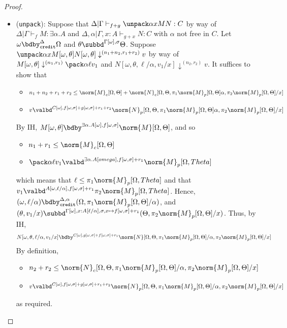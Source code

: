\begin{proof}
\begin{itemize}
  \item (\texttt{unpack}): Suppose that $\Delta | \Gamma \vdash_{f+g} \unpack \alpha x M N : C$ by way of $\Delta | \Gamma \vdash_f M : \exists \alpha.A$ and $\Delta,\alpha | \Gamma,x:A \vdash_{g+x} N : C$ with $\alpha$ not free in $C$. Let $\omega \bdby_\texttt{credit}^\Delta \Omega$ and $\theta \subbd^{\Gamma[\omega],\sigma} \Theta$. Suppose $ \unpack \alpha x {M[\omega,\theta]} {N[\omega,\theta]} \downarrow^{(n_1+n_2,r_1+r_2)} v$ by way of $M[\omega,\theta] \downarrow^{(n_1,r_1)} \pack \alpha \ell {v_1}$ and $N[\omega,\theta,\ell/\alpha,v_1/x]  \downarrow^{(n_2,r_2)} v$. It suffices to show that
  \begin{itemize}
    \item $n_1 + n_2 + r_1 + r_2 \leq \norm{M}_c[\Omega,\Theta] + \norm{N}_c[\Omega,\Theta,\pi_1\norm{M}_p[\Omega,\Theta]\alpha,\pi_2\norm{M}_p[\Omega,\Theta]/x]$
    \item $v \valbd^{C[\omega],f[\omega,\sigma] + g[\omega,\sigma] + r_1 + r_2} \norm{N}_p[\Omega,\Theta,\pi_1\norm{M}_p[\Omega,\Theta]\alpha,\pi_2\norm{M}_p[\Omega,\Theta]/x]$
  \end{itemize}
  By IH, $M[\omega,\theta] \bdby^{\exists \alpha.A[\omega],f[\omega,\sigma]} \norm{M}[\Omega,\Theta]$, and so
  \begin{itemize}
    \item $n_1 + r_1 \leq \norm{M}_c[\Omega,\Theta]$
    \item $\pack \alpha \ell {v_1} \valbd^{\exists \alpha.A[omega],f[\omega,\sigma] + r_1}\norm{M}_p[\Omega,Theta]$
  \end{itemize}
  which means that $\ell \leq \pi_1 \norm{M}_p[\Omega,Theta]$ and that $v_1 \valbd^{A[\omega,\ell/\alpha],f[\omega,\sigma] + r_1} \pi_2 \norm{M}_p[\Omega,Theta]$.
  Hence, $(\omega,\ell/\alpha) \bdby_{\texttt{credit}}^{\Delta,\alpha}(\Omega,\pi_1 \norm{M}_p[\Omega,\Theta]/\alpha)$, and $(\theta,v_1/x) \subbd^{\Gamma[\omega],x:A[\ell/\alpha],\sigma,x\mapsto f[\omega,\sigma] + r_1} (\Theta,\pi_2 \norm{M}_p[\Omega,\Theta]/x)$. Thus, by IH, $$N[\omega,\theta,\ell/\alpha,v_1/x] \bdby^{C[\omega],g[\omega,\sigma] + f[\omega,\sigma] + r_1} \norm{N}[\Omega,\Theta,\pi_1 \norm{M}_p[\Omega,\Theta]/\alpha,\pi_2 \norm{M}_p[\Omega,\Theta]/x]$$ By definition,
  \begin{itemize}
    \item $n_2 + r_2 \leq \norm{N}_c[\Omega,\Theta,\pi_1 \norm{M}_p[\Omega,\Theta]/\alpha,\pi_2 \norm{M}_p[\Omega,\Theta]/x]$
    \item $v \valbd^{C[\omega],f[\omega,\sigma] + g[\omega,\sigma] + r_1 + r_2} \norm{N}_p[\Omega,\Theta,\pi_1 \norm{M}_p[\Omega,\Theta]/\alpha,\pi_2 \norm{M}_p[\Omega,\Theta]/x]$
  \end{itemize}
  as required.
\end{itemize}
\end{proof}